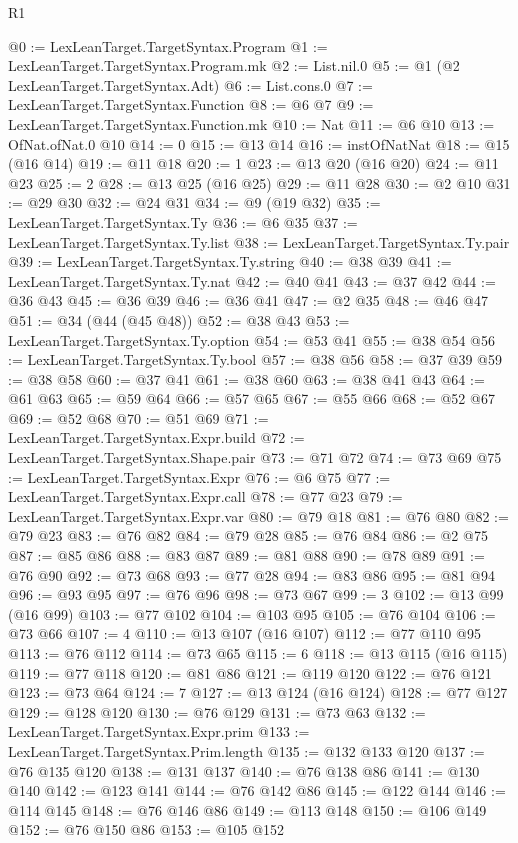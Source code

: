 \begin{lexlean}{R1}
\begin{coremodule}
{{{{{{{{{{{{{{{{{{{{@0 := LexLeanTarget.TargetSyntax.Program
@1 := LexLeanTarget.TargetSyntax.Program.mk
@2 := List.nil.{0}
@5 := @1 (@2 LexLeanTarget.TargetSyntax.Adt)
@6 := List.cons.{0}
@7 := LexLeanTarget.TargetSyntax.Function
@8 := @6 @7
@9 := LexLeanTarget.TargetSyntax.Function.mk
@10 := Nat
@11 := @6 @10
@13 := OfNat.ofNat.{0} @10
@14 := 0
@15 := @13 @14
@16 := instOfNatNat
@18 := @15 (@16 @14)
@19 := @11 @18
@20 := 1
@23 := @13 @20 (@16 @20)
@24 := @11 @23
@25 := 2
@28 := @13 @25 (@16 @25)
@29 := @11 @28
@30 := @2 @10
@31 := @29 @30
@32 := @24 @31
@34 := @9 (@19 @32)
@35 := LexLeanTarget.TargetSyntax.Ty
@36 := @6 @35
@37 := LexLeanTarget.TargetSyntax.Ty.list
@38 := LexLeanTarget.TargetSyntax.Ty.pair
@39 := LexLeanTarget.TargetSyntax.Ty.string
@40 := @38 @39
@41 := LexLeanTarget.TargetSyntax.Ty.nat
@42 := @40 @41
@43 := @37 @42
@44 := @36 @43
@45 := @36 @39
@46 := @36 @41
@47 := @2 @35
@48 := @46 @47
@51 := @34 (@44 (@45 @48))
@52 := @38 @43
@53 := LexLeanTarget.TargetSyntax.Ty.option
@54 := @53 @41
@55 := @38 @54
@56 := LexLeanTarget.TargetSyntax.Ty.bool
@57 := @38 @56
@58 := @37 @39
@59 := @38 @58
@60 := @37 @41
@61 := @38 @60
@63 := @38 @41 @43
@64 := @61 @63
@65 := @59 @64
@66 := @57 @65
@67 := @55 @66
@68 := @52 @67
@69 := @52 @68
@70 := @51 @69
@71 := LexLeanTarget.TargetSyntax.Expr.build
@72 := LexLeanTarget.TargetSyntax.Shape.pair
@73 := @71 @72
@74 := @73 @69
@75 := LexLeanTarget.TargetSyntax.Expr
@76 := @6 @75
@77 := LexLeanTarget.TargetSyntax.Expr.call
@78 := @77 @23
@79 := LexLeanTarget.TargetSyntax.Expr.var
@80 := @79 @18
@81 := @76 @80
@82 := @79 @23
@83 := @76 @82
@84 := @79 @28
@85 := @76 @84
@86 := @2 @75
@87 := @85 @86
@88 := @83 @87
@89 := @81 @88
@90 := @78 @89
@91 := @76 @90
@92 := @73 @68
@93 := @77 @28
@94 := @83 @86
@95 := @81 @94
@96 := @93 @95
@97 := @76 @96
@98 := @73 @67
@99 := 3
@102 := @13 @99 (@16 @99)
@103 := @77 @102
@104 := @103 @95
@105 := @76 @104
@106 := @73 @66
@107 := 4
@110 := @13 @107 (@16 @107)
@112 := @77 @110 @95
@113 := @76 @112
@114 := @73 @65
@115 := 6
@118 := @13 @115 (@16 @115)
@119 := @77 @118
@120 := @81 @86
@121 := @119 @120
@122 := @76 @121
@123 := @73 @64
@124 := 7
@127 := @13 @124 (@16 @124)
@128 := @77 @127
@129 := @128 @120
@130 := @76 @129
@131 := @73 @63
@132 := LexLeanTarget.TargetSyntax.Expr.prim
@133 := LexLeanTarget.TargetSyntax.Prim.length
@135 := @132 @133 @120
@137 := @76 @135 @120
@138 := @131 @137
@140 := @76 @138 @86
@141 := @130 @140
@142 := @123 @141
@144 := @76 @142 @86
@145 := @122 @144
@146 := @114 @145
@148 := @76 @146 @86
@149 := @113 @148
@150 := @106 @149
@152 := @76 @150 @86
@153 := @105 @152
}}}}}}}}}}}}}}}}}}}}
\end{coremodule}
\end{lexlean}

